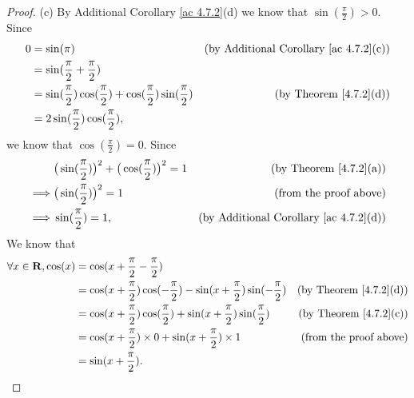 \begin{proof}{(c)}
    By Additional Corollary \ref{ac 4.7.2}(d) we know that \(\sin(\frac{\pi}{2}) > 0\).
    Since
    \begin{align*}
        0 & = \sin(\pi)                                                                         & \text{(by Additional Corollary \ref{ac 4.7.2}(c))} \\
          & = \sin(\frac{\pi}{2} + \frac{\pi}{2})                                                                                                    \\
          & = \sin(\frac{\pi}{2}) \cos(\frac{\pi}{2}) + \cos(\frac{\pi}{2}) \sin(\frac{\pi}{2}) & \text{(by Theorem \ref{4.7.2}(d))}                 \\
          & = 2 \sin(\frac{\pi}{2}) \cos(\frac{\pi}{2}),
    \end{align*}
    we know that \(\cos(\frac{\pi}{2}) = 0\).
    Since
    \begin{align*}
                 & \big(\sin(\frac{\pi}{2})\big)^2 + \big(\cos(\frac{\pi}{2})\big)^2 = 1 & \text{(by Theorem \ref{4.7.2}(a))}                 \\
        \implies & \big(\sin(\frac{\pi}{2})\big)^2 = 1                                   & \text{(from the proof above)}                      \\
        \implies & \sin(\frac{\pi}{2}) = 1,                                              & \text{(by Additional Corollary \ref{ac 4.7.2}(d))}
    \end{align*}
    We know that
    \begin{align*}
        \forall x \in \mathbf{R}, \cos(x) & = \cos(x + \frac{\pi}{2} - \frac{\pi}{2})                                                                                          \\
                                          & = \cos(x + \frac{\pi}{2}) \cos(-\frac{\pi}{2}) - \sin(x + \frac{\pi}{2}) \sin(-\frac{\pi}{2}) & \text{(by Theorem \ref{4.7.2}(d))} \\
                                          & = \cos(x + \frac{\pi}{2}) \cos(\frac{\pi}{2}) + \sin(x + \frac{\pi}{2}) \sin(\frac{\pi}{2})   & \text{(by Theorem \ref{4.7.2}(c))} \\
                                          & = \cos(x + \frac{\pi}{2}) \times 0 + \sin(x + \frac{\pi}{2}) \times 1                         & \text{(from the proof above)}      \\
                                          & = \sin(x + \frac{\pi}{2}).

\end{align*}
\end{proof}
